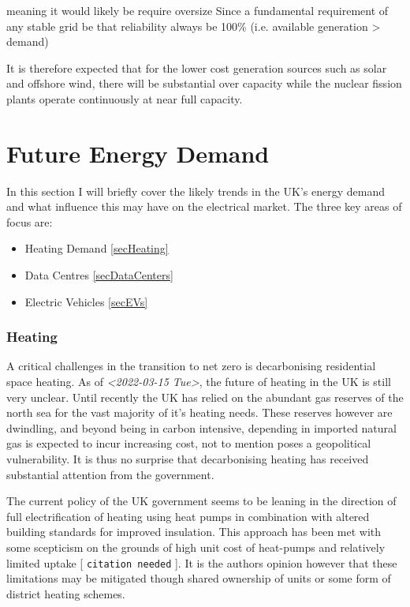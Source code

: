 \documentclass[11pt]{article}
\numberwithin{equation}{section}
\begin{document}
meaning  it would likely be require oversize Since a fundamental requirement of any stable grid be that reliability always be 100\% (i.e. available generation > demand)

It is therefore expected that for the lower cost generation sources such as solar and offshore wind, there will be substantial over capacity while the nuclear fission plants operate continuously at near full capacity.

\section{Future Energy Demand}
\label{sec:org43e10b6}
In this section I will briefly cover the likely trends in the UK's energy demand and what influence this may have on the electrical market. The three key areas of focus are:
\begin{itemize}
\item Heating Demand \ref{secHeating}
\item Data Centres \ref{secDataCenters}
\item Electric Vehicles \ref{secEVs}
\end{itemize}

\subsubsection{Heating \label{secHeating}}
\label{sec:orga9fb1d8}
A critical challenges in the transition to net zero is decarbonising residential space heating. As of \textit{<2022-03-15 Tue>}, the future of heating in the UK is still very unclear. Until recently the UK has relied on the abundant gas reserves of the north sea for the vast majority of it's heating needs. These reserves however are dwindling, and beyond being in carbon intensive, depending in imported natural gas is expected to incur increasing cost, not to mention poses a geopolitical vulnerability. It is thus no surprise that decarbonising heating has received substantial attention from the government.

The current policy of the UK government seems to be leaning in the direction of full electrification of heating using heat pumps in combination with altered building standards for improved insulation. This approach has been met with some scepticism on the grounds of high unit cost of heat-pumps and relatively limited uptake [ \texttt{citation needed} ]. It is the authors opinion however that these limitations may be mitigated though shared ownership of units or some form of district heating schemes.
\end{document}
